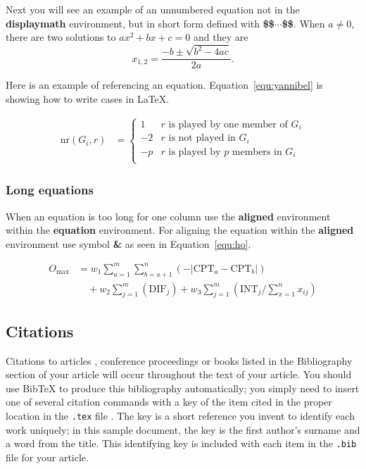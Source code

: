 \documentclass[article,english]{stucosrec}
\newcommand{\latex}{\LaTeX\xspace}
\newcommand{\bibtex}{Bib\TeX\xspace}
\begin{document}
	Next you will see an example of an unnumbered equation not in the \textbf{displaymath} environment, but in short form defined with \textbf{\$\$$\cdots$\$\$}.
	When $a \ne 0$, there are two solutions to $ax^2 + bx + c = 0$ and they are $$x_{1, 2} = \frac{-b \pm \sqrt{b^2-4ac}}{2a}.$$
	
	Here is an example of referencing an equation. Equation~\ref{equ:yannibel} is showing how to write cases in \latex.
	
	\begin{equation}
		\begin{aligned} 
			\mathrm{nr}(G_i,r) & = \label{equ:yannibel}
			\begin{cases}
				1  & \text{$r$ is played by one member of $G_i$}\\
				-2 & \text{$r$ is not played in $G_i$} \\
				-p & \text{$r$ is played by $p$ members in $G_i$}\\
			\end{cases}
		\end{aligned}
	\end{equation}
	
	\subsubsection{Long equations}
	
	When an equation is too long for one column use the \textbf{aligned} environment within the \textbf{equation} environment.
	For aligning the equation within the \textbf{aligned} environment use symbol \textbf{\&} as seen in Equation~\ref{equ:ho}.
	
	\begin{equation}
		\begin{aligned}
			O_{\max}& = w_1 \sum_{a=1}^{m} \sum_{b=a+1}^{n} (-\lvert\text{CPT}_a 
			-\text{CPT}_b\rvert)\\ 
			&\quad + w_2 \sum_{j=1}^{m} (\text{DIF}_j) + w_3 \sum_{j=1}^{m} 
			(\text{INT}_j/\sum_{x=1}^{n} x_{ij})
		\end{aligned}
		\label{equ:ho}
	\end{equation}
	
	\subsection{Citations}
	
	Citations to articles \cite{lecun2015deep, braams:babel, herlihy:methodology}, conference proceedings \cite{vrbancic2019transfer, clark:pct} or books \cite{salas:calculus, Lamport:LaTeX, fister2019computational} listed
	in the Bibliography section of your article will occur throughout the text of your article.
	You should use \bibtex to produce this bibliography automatically; you simply need to insert one of several citation commands with a key of the item cited in the proper location in the \texttt{.tex} file \cite{Lamport:LaTeX}.
	The key is a short reference you invent to identify each work uniquely; in this sample document, the key is the first author's surname and a word from the title.
	This identifying key is included with each item in the \texttt{.bib} file for your article.
	
\end{document}
